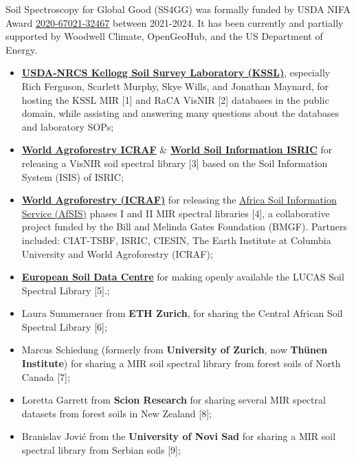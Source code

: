\documentclass[
  letterpaper,
  DIV=11,
  numbers=noendperiod]{scrreprt}
\providecommand{\tightlist}{%
  \setlength{\itemsep}{0pt}\setlength{\parskip}{0pt}}\usepackage{longtable,booktabs,array}
\begin{document}
\begin{tcolorbox}[enhanced jigsaw, title=\textcolor{quarto-callout-tip-color}{\faLightbulb}\hspace{0.5em}{Funding}, rightrule=.15mm, coltitle=black, opacityback=0, bottomrule=.15mm, colframe=quarto-callout-tip-color-frame, breakable, arc=.35mm, titlerule=0mm, toptitle=1mm, left=2mm, colback=white, toprule=.15mm, leftrule=.75mm, bottomtitle=1mm, opacitybacktitle=0.6, colbacktitle=quarto-callout-tip-color!10!white]

Soil Spectroscopy for Global Good (SS4GG) was formally funded by USDA
NIFA Award
\href{https://portal.nifa.usda.gov/web/crisprojectpages/1023775-fact-cin-soil-spectroscopy-for-the-global-good.html}{2020-67021-32467}
between 2021-2024. It has been currently and partially supported by
Woodwell Climate, OpenGeoHub, and the US Department of Energy.

\end{tcolorbox}

\begin{itemize}
\tightlist
\item
  \href{https://ncsslabdatamart.sc.egov.usda.gov/}{\textbf{USDA-NRCS
  Kellogg Soil Survey Laboratory (KSSL)}}, especially Rich Ferguson,
  Scarlett Murphy, Skye Wills, and Jonathan Maynard, for hosting the
  KSSL MIR {[}1{]} and RaCA VisNIR {[}2{]} databases in the public
  domain, while assisting and answering many questions about the
  databases and laboratory SOPs;
\item
  \href{https://www.cifor-icraf.org/}{\textbf{World Agroforestry ICRAF}}
  \&
  \href{https://www.isric.org/explore/isric-soil-data-hub}{\textbf{World
  Soil Information ISRIC}} for releasing a VisNIR soil spectral library
  {[}3{]} based on the Soil Information System (ISIS) of ISRIC;
\item
  \href{https://www.cifor-icraf.org/}{\textbf{World Agroforestry
  (ICRAF)}} for releasing the
  \href{https://data.worldagroforestry.org/dataverse/icraf_soils}{Africa
  Soil Information Service (AfSIS)} phases I and II MIR spectral
  libraries {[}4{]}, a collaborative project funded by the Bill and
  Melinda Gates Foundation (BMGF). Partners included: CIAT-TSBF, ISRIC,
  CIESIN, The Earth Institute at Columbia University and World
  Agroforestry (ICRAF);
\item
  \href{http://esdac.jrc.ec.europa.eu/}{\textbf{European Soil Data
  Centre}} for making openly available the LUCAS Soil Spectral Library
  {[}5{]}.;
\item
  Laura Summerauer from \textbf{ETH Zurich}, for sharing the Central
  African Soil Spectral Library {[}6{]};
\item
  Marcus Schiedung (formerly from \textbf{University of Zurich}, now
  \textbf{Thünen Institute}) for sharing a MIR soil spectral library
  from forest soils of North Canada {[}7{]};
\item
  Loretta Garrett from \textbf{Scion Research} for sharing several MIR
  spectral datasets from forest soils in New Zealand {[}8{]};
\item
  Branislav Jović from the \textbf{University of Novi Sad} for sharing a
  MIR soil spectral library from Serbian soils {[}9{]};
\end{itemize}
\end{document}
